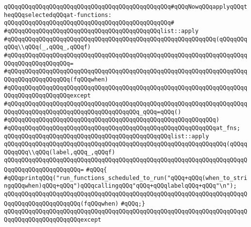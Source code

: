 \newline
\newline
\newline
\verb|qQQqqQQqqQQqqQQqqQQqqQQqqQQqqQQqqQQqqQQqqQQqqQQq#qQQqNowqQQqapplyqQQqtheqQQqselectedqQQqat-functions:|\newline
\verb|qQQqqQQqqQQqqQQqqQQqqQQqqQQqqQQqqQQqqQQqqQQqqQQq#|\newline
\verb|#qQQqqQQqqQQqqQQqqQQqqQQqqQQqqQQqqQQqqQQqqQQqlist::apply|\newline
\verb|#qQQqqQQqqQQqqQQqqQQqqQQqqQQqqQQqqQQqqQQqqQQqqQQqqQQqqQQqqQQq(qQQqqQQqqQQq\\qQQq(_,qQQq_,qQQqf)|\newline
\verb|#qQQqqQQqqQQqqQQqqQQqqQQqqQQqqQQqqQQqqQQqqQQqqQQqqQQqqQQqqQQqqQQqqQQqqQQqqQQqqQQqqQQqqQQq=|\newline
\verb|#qQQqqQQqqQQqqQQqqQQqqQQqqQQqqQQqqQQqqQQqqQQqqQQqqQQqqQQqqQQqqQQqqQQqqQQqqQQqqQQqqQQqqQQq(fqQQqwhen)|\newline
\verb|#qQQqqQQqqQQqqQQqqQQqqQQqqQQqqQQqqQQqqQQqqQQqqQQqqQQqqQQqqQQqqQQqqQQqqQQqqQQqqQQqqQQqqQQqexcept|\newline
\verb|#qQQqqQQqqQQqqQQqqQQqqQQqqQQqqQQqqQQqqQQqqQQqqQQqqQQqqQQqqQQqqQQqqQQqqQQqqQQqqQQqqQQqqQQqqQQqqQQqqQQqqQQqqQQq_qQQq=qQQq()|\newline
\verb|#qQQqqQQqqQQqqQQqqQQqqQQqqQQqqQQqqQQqqQQqqQQqqQQqqQQqqQQqqQQq)|\newline
\verb|#qQQqqQQqqQQqqQQqqQQqqQQqqQQqqQQqqQQqqQQqqQQqqQQqqQQqqQQqqQQqat_fns;|\newline
\newline
\verb|qQQqqQQqqQQqqQQqqQQqqQQqqQQqqQQqqQQqqQQqqQQqqQQqlist::apply|\newline
\verb|qQQqqQQqqQQqqQQqqQQqqQQqqQQqqQQqqQQqqQQqqQQqqQQqqQQqqQQqqQQqqQQq(qQQqqQQqqQQq\\qQQq(label,qQQq_,qQQqf)|\newline
\verb|qQQqqQQqqQQqqQQqqQQqqQQqqQQqqQQqqQQqqQQqqQQqqQQqqQQqqQQqqQQqqQQqqQQqqQQqqQQqqQQqqQQqqQQqqQQq=|\newline
\verb|#qQQq{|\newline
\verb|#qQQqprintqQQq("run_functions_scheduled_to_run("qQQq+qQQq(when_to_stringqQQqwhen)qQQq+qQQq")qQQqcallingqQQq"qQQq+qQQqlabelqQQq+qQQq"\n");|\newline
\verb|qQQqqQQqqQQqqQQqqQQqqQQqqQQqqQQqqQQqqQQqqQQqqQQqqQQqqQQqqQQqqQQqqQQqqQQqqQQqqQQqqQQqqQQqqQQq(fqQQqwhen)|\newline
\verb|#qQQq;}|\newline
\verb|qQQqqQQqqQQqqQQqqQQqqQQqqQQqqQQqqQQqqQQqqQQqqQQqqQQqqQQqqQQqqQQqqQQqqQQqqQQqqQQqqQQqqQQqqQQqexcept|\newline
